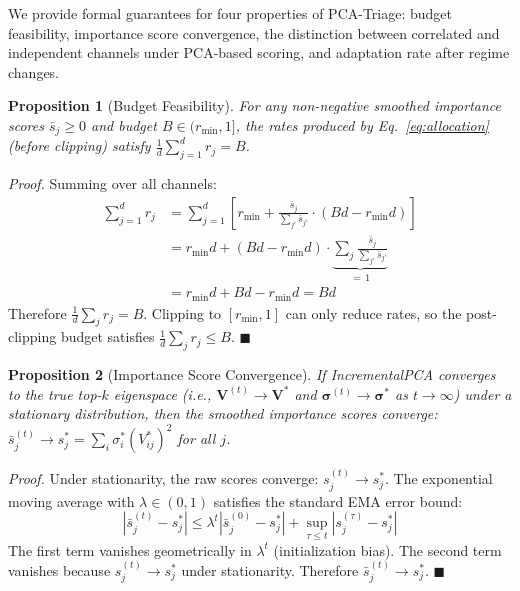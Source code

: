 \documentclass[journal]{IEEEtran}
\newtheorem{proposition}{Proposition}
\renewenvironment{proof}[1][Proof]{\noindent\textit{#1.}\space}{\hfill$\blacksquare$\par\medskip}
\begin{document}
We provide formal guarantees for four properties of PCA-Triage: budget feasibility, importance score convergence, the distinction between correlated and independent channels under PCA-based scoring, and adaptation rate after regime changes.

\begin{proposition}[Budget Feasibility]
\label{prop:budget}
For any non-negative smoothed importance scores $\bar{s}_j \geq 0$ and budget $B \in (r_{\min}, 1]$, the rates produced by Eq.~\ref{eq:allocation} (before clipping) satisfy $\frac{1}{d}\sum_{j=1}^d r_j = B$.
\end{proposition}

\begin{proof}
Summing over all channels:
\begin{align}
\sum_{j=1}^d r_j &= \sum_{j=1}^d \left[ r_{\min} + \frac{\bar{s}_j}{\sum_{j'} \bar{s}_{j'}} \cdot (Bd - r_{\min} d) \right] \nonumber \\
&= r_{\min} d + (Bd - r_{\min} d) \cdot \underbrace{\sum_j \frac{\bar{s}_j}{\sum_{j'} \bar{s}_{j'}}}_{=\,1} \nonumber \\
&= r_{\min} d + Bd - r_{\min} d = Bd
\end{align}
Therefore $\frac{1}{d}\sum_j r_j = B$. Clipping to $[r_{\min}, 1]$ can only reduce rates, so the post-clipping budget satisfies $\frac{1}{d}\sum_j r_j \leq B$.
\end{proof}

\begin{proposition}[Importance Score Convergence]
\label{prop:convergence}
If IncrementalPCA converges to the true top-$k$ eigenspace (i.e., $\mathbf{V}^{(t)} \to \mathbf{V}^*$ and $\boldsymbol{\sigma}^{(t)} \to \boldsymbol{\sigma}^*$ as $t \to \infty$) under a stationary distribution, then the smoothed importance scores converge: $\bar{s}_j^{(t)} \to s_j^* = \sum_i \sigma_i^* (V_{ij}^*)^2$ for all $j$.
\end{proposition}

\begin{proof}
Under stationarity, the raw scores converge: $s_j^{(t)} \to s_j^*$. The exponential moving average with $\lambda \in (0, 1)$ satisfies the standard EMA error bound:
\begin{equation}
|\bar{s}_j^{(t)} - s_j^*| \leq \lambda^t |\bar{s}_j^{(0)} - s_j^*| + \sup_{\tau \leq t} |s_j^{(\tau)} - s_j^*|
\end{equation}
The first term vanishes geometrically in $\lambda^t$ (initialization bias). The second term vanishes because $s_j^{(t)} \to s_j^*$ under stationarity. Therefore $\bar{s}_j^{(t)} \to s_j^*$.
\end{proof}
\end{document}
